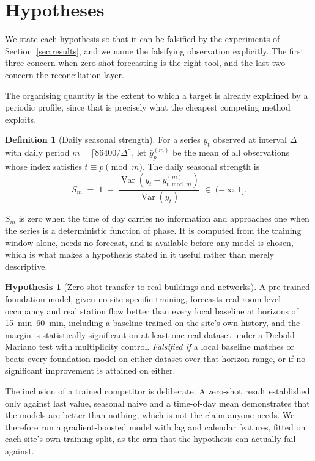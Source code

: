 \documentclass[utf8]{FrontiersinHarvard}
\theoremstyle{plain}
\theoremstyle{definition}
\newtheorem{definition}[theorem]{Definition}
\newtheorem{hypothesis}{Hypothesis}
\theoremstyle{remark}
\begin{document}
\section{Hypotheses}
\label{sec:hypotheses}

We state each hypothesis so that it can be falsified by the experiments of Section~\ref{sec:results}, and we name the falsifying observation explicitly. The first three concern when zero-shot forecasting is the right tool, and the last two concern the reconciliation layer.

The organising quantity is the extent to which a target is already explained by a periodic profile, since that is precisely what the cheapest competing method exploits.

\begin{definition}[Daily seasonal strength]
\label{def:strength}
For a series $y_t$ observed at interval $\Delta$ with daily period $m = \lceil 86400/\Delta \rceil$, let $\bar{y}^{(m)}_{p}$ be the mean of all observations whose index satisfies $t \equiv p \pmod m$. The daily seasonal strength is
\begin{equation}
S_m \;=\; 1 \;-\; \frac{\operatorname{Var}\!\left(y_t - \bar{y}^{(m)}_{t \bmod m}\right)}{\operatorname{Var}(y_t)} \;\in\; (-\infty, 1].
\label{eq:strength}
\end{equation}
\end{definition}
$S_m$ is zero when the time of day carries no information and approaches one when the series is a deterministic function of phase. It is computed from the training window alone, needs no forecast, and is available before any model is chosen, which is what makes a hypothesis stated in it useful rather than merely descriptive.

\begin{hypothesis}[Zero-shot transfer to real buildings and networks]
\label{hyp:transfer}
A pre-trained foundation model, given no site-specific training, forecasts real room-level occupancy and real station flow better than every local baseline at horizons of \SIrange{15}{60}{\minute}, including a baseline trained on the site's own history, and the margin is statistically significant on at least one real dataset under a Diebold-Mariano test with multiplicity control.
\emph{Falsified if} a local baseline matches or beats every foundation model on either dataset over that horizon range, or if no significant improvement is attained on either.
\end{hypothesis}

The inclusion of a trained competitor is deliberate. A zero-shot result established only against last value, seasonal naive and a time-of-day mean demonstrates that the models are better than nothing, which is not the claim anyone needs. We therefore run a gradient-boosted model with lag and calendar features, fitted on each site's own training split, as the arm that the hypothesis can actually fail against.
\end{document}
